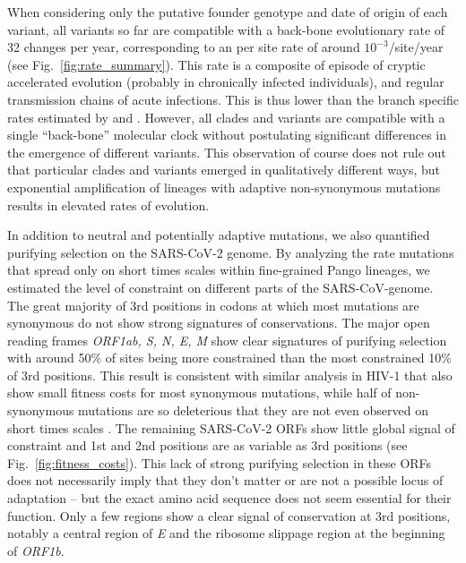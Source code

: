 \documentclass[aps,rmp, twocolumn]{revtex4}
\begin{document}
When considering only the putative founder genotype and date of origin of each variant, all variants so far are compatible with a back-bone evolutionary rate of 32 changes per year, corresponding to an per site rate of around $10^{-3}$/site/year (see Fig.~\ref{fig:rate_summary}).
This rate is a composite of episode of cryptic accelerated evolution (probably in chronically infected individuals), and regular transmission chains of acute infections.
This is thus lower than the branch specific rates estimated by \citet{hill_origins_2022} and \citet{tay_emergence_2022}.
However, all clades and variants are compatible with a single ``back-bone'' molecular clock without postulating significant differences in the emergence of different variants.
This observation of course does not rule out that particular clades and variants emerged in qualitatively different ways, but exponential amplification of lineages with adaptive non-synonymous mutations results in elevated rates of evolution.

In addition to neutral and potentially adaptive mutations, we also quantified purifying selection on the SARS-CoV-2 genome.
By analyzing the rate mutations that spread only on short times scales within fine-grained Pango lineages, we estimated the level of constraint on different parts of the SARS-CoV-genome.
The great majority of 3rd positions in codons at which  most mutations are synonymous do not show strong signatures of conservations.
The major open reading frames \emph{ORF1ab, S, N, E, M} show clear signatures of purifying selection with around 50\% of sites being more constrained than the most constrained 10\% of 3rd positions.
This result is consistent with similar analysis in HIV-1 that also show small fitness costs for most synonymous mutations, while half of non-synonymous mutations are so deleterious that they are not even observed on short times scales \citep{zanini_vivo_2017}.
The remaining SARS-CoV-2 ORFs show little global signal of constraint and 1st and 2nd positions are as variable as 3rd positions (see Fig.~\ref{fig:fitness_costs}).
This lack of strong purifying selection in these ORFs does not necessarily imply that they don't matter or are not a possible locus of adaptation -- but the exact amino acid sequence does not seem essential for their function.
Only a few regions show a clear signal of conservation at 3rd positions, notably a central region of \emph{E} and the ribosome slippage region at the beginning of \emph{ORF1b}.
\end{document}
